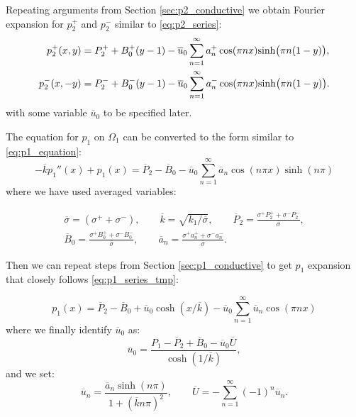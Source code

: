 \documentclass{elsarticle}
\def\ol#1{\overline{#1}}
\begin{document}
Repeating arguments from Section \ref{sec:p2_conductive} we obtain Fourier expansion for $p_2^+$ and $p_2^-$ similar to \eqref{eq:p2_series}:
\begin{align}
    \label{eq:p2_barrier_p}
    p_2^+(x,  y) &= P_2^+ + B_0^+(y-1) - \ol{u}_0\sum_{n=1}^\infty a_n^+ \cos(\pi n x) {\rm sinh} \big(\pi n(1-y)\big),\\ 
    \label{eq:p2_barrier_m}
    p_2^-(x, -y) &= P_2^- + B_0^-(y-1) - \ol{u}_0\sum_{n=1}^\infty a_n^- \cos(\pi n x) {\rm sinh} \big(\pi n(1-y)\big).
\end{align}
with some variable $\ol{u}_0$ to be specified later.

The equation for $p_1$ on $\Omega_1$ can be converted to the form similar to \eqref{eq:p1_equation}:
\begin{equation}
    \label{eq:p1_barrier_equation}
    - \ol{k}  p_1''(x) + p_1(x) = \ol{P}_2 - \ol{B}_0 - \ol{u}_0\sum_{n=1}^{\infty} \ol{a}_n \cos(n \pi x) \sinh(n \pi)
\end{equation}
where we have used averaged variables:


\begin{gather*}
    \ol{\sigma} = (\sigma^+ + \sigma^-), \qquad
    \ol{k} = \sqrt{k_1/\ol{\sigma}}, \qquad
    \ol{P}_2 = \frac{\sigma^+ P_2^+ + \sigma^- P_2^-}{\ol{\sigma}}, \\
%    
    \ol{B}_0 = \frac{\sigma^+ B_0^+ + \sigma^- B_0^-}{\ol{\sigma}}, \qquad
    \ol{a}_n = \frac{\sigma^+ a_n^+ + \sigma^- a_n^-}{\ol{\sigma}}.  
\end{gather*}

Then we can repeat steps from Section \ref{sec:p1_conductive} to get $p_1$ expansion that closely follows
\eqref{eq:p1_series_tmp}:

\begin{equation}
    \label{eq:barrier_p1_series}
    p_1(x) = \ol{P}_2 -  \ol{B}_0 + \ol{u}_0 \cosh(x/\ol{k}) - \ol{u}_0 \sum_{n=1}^\infty  \ol{u}_n \cos(\pi n x) 
\end{equation}
where we finally identify $\ol{u}_0$ as:
\begin{equation}
    \label{eq:barrier_u0_def}    
    \ol{u}_0 = \frac{P_1 - \ol{P}_2 + \ol{B}_0 - \ol{u}_0 \ol{U}}{\cosh(1/\ol{k})},
\end{equation}
and we set:
\begin{equation}
    \label{eq:barrier_un}
    \ol{u}_n = \frac{\ol{a}_n \sinh(n \pi)}{1 + (\ol{k} n \pi)^2}, \qquad
    \ol{U} =  -\sum_{n=1}^{\infty} (-1)^n \ol{u}_n.
\end{equation}
\end{document}
